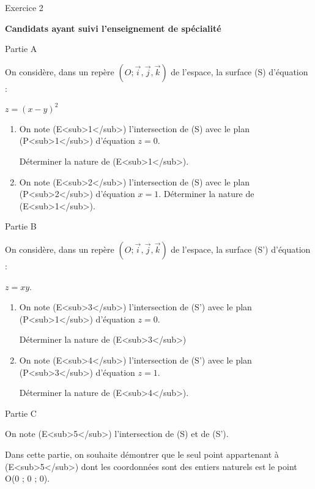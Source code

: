 
%
\begin{h2}Exercice 2\end{h2}
\textbf{Candidats ayant suivi l'enseignement de spécialité}
\begin{h3}Partie A\end{h3}
On considère, dans un repère $\left(O ; \vec{i},\vec{j},\vec{k}\right)$ de l'espace, la surface (S) d'équation :

\begin{center}
$z=\left(x-y\right)^{2}$
\end{center}

\begin{enumerate}
     \item
     On note (E<sub>1</sub>) l'intersection de (S) avec le plan (P<sub>1</sub>) d'équation $z=0$.
     \par
     Déterminer la nature de (E<sub>1</sub>).
     \item
     On note (E<sub>2</sub>) l'intersection de (S) avec le plan (P<sub>2</sub>) d'équation $x=1$. Déterminer la nature de (E<sub>1</sub>).
\end{enumerate}
\begin{h3}Partie B\end{h3}
On considère, dans un repère $\left(O ; \vec{i},\vec{j},\vec{k}\right)$ de l'espace, la surface (S') d'équation :
\par
$z=xy$.
\begin{enumerate}
     \item
     On note (E<sub>3</sub>) l'intersection de (S') avec le plan (P<sub>1</sub>) d'équation $z=0$.
     \par
     Déterminer la nature de (E<sub>3</sub>)
     \item
     On note (E<sub>4</sub>) l'intersection de (S') avec le plan (P<sub>3</sub>) d'équation $z=1$.
     \par
     Déterminer la nature de (E<sub>4</sub>).
\end{enumerate}
\begin{h3}Partie C\end{h3}
On note (E<sub>5</sub>) l'intersection de (S) et de (S').
\par
Dans cette partie, on souhaite démontrer que le seul point appartenant à (E<sub>5</sub>) dont les coordonnées sont des entiers naturels est le point O(0 ; 0 ; 0).
\par
